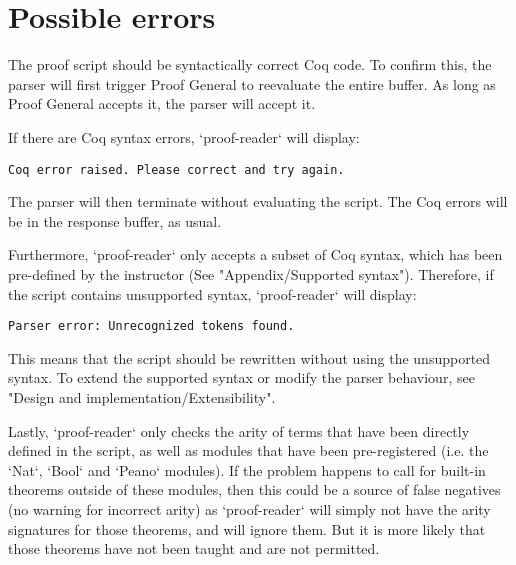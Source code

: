 \section{Possible errors}

The proof script should be syntactically correct Coq code. To confirm this, the parser will first trigger Proof General to reevaluate the entire buffer. As long as Proof General accepts it, the parser will accept it.

If there are Coq syntax errors, `proof-reader` will display:
\begin{lstlisting}
Coq error raised. Please correct and try again.
\end{lstlisting}
The parser will then terminate without evaluating the script. The Coq errors will be in the response buffer, as usual.

Furthermore, `proof-reader` only accepts a subset of Coq syntax, which has been pre-defined by the instructor (See "Appendix/Supported syntax"). Therefore, if the script contains unsupported syntax, `proof-reader` will display:

\begin{lstlisting}
Parser error: Unrecognized tokens found.
\end{lstlisting}

This means that the script should be rewritten without using the unsupported syntax. To extend the supported syntax or modify the parser behaviour, see "Design and implementation/Extensibility".

Lastly, `proof-reader` only checks the arity of terms that have been directly defined in the script, as well as modules that have been pre-registered (i.e. the `Nat`, `Bool` and `Peano` modules). If the problem happens to call for built-in theorems outside of these modules, then this could be a source of false negatives (no warning for incorrect arity) as `proof-reader` will simply not have the arity signatures for those theorems, and will ignore them. But it is more likely that those theorems have not been taught and are not permitted.